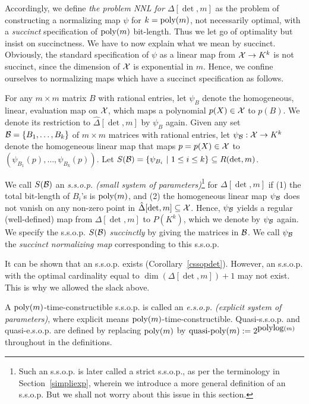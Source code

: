 \documentclass[11pt]{article}
\begin{document}
Accordingly, we define {\em the problem NNL for $\Delta[\det,m]$}
as  the problem of constructing  a normalizing map $\psi$ for $k={\mbox {poly}}(m)$, not necessarily optimal,
with a {\em succinct} specification of ${\mbox {poly}}(m)$ bit-length. Thus we let go of optimality but insist on succinctness.
We have to now explain what we mean by  succinct.
Obviously,  the standard specification of $\psi$ as a linear map from
${\cal X} \to K^k$ is not succinct, since the dimension of ${\cal X}$ is exponential in $m$. 
Hence, we  confine ourselves to normalizing maps which have a succinct specification as follows.


For any $m \times m$  matrix $B$ with rational entries, let
$\psi_{B}$ denote the homogeneous, linear, evaluation map on  ${\cal X}$, which maps a polynomial
$p(X) \in {\cal X}$ to $p(B)$. We denote its restriction to $\hat \Delta[\det,m]$ by $\psi_B$ again.
Given any set ${\cal B}=\{B_1,\ldots,B_k\}$ of $m\times m$  matrices with 
rational entries, 
let $\psi_{{\cal B}}: {\cal X}  \rightarrow K^k$ denote the homogeneous linear map that maps 
$p=p(X) \in {\cal X}$ to $(\psi_{B_1}(p),\ldots,\psi_{B_k}(p))$. 
Let $S({\cal B})=\{\psi_{B_i} \ | \ 1 \le i \le k \} \subseteq R(\det,m)$.

We call $S({\cal B})$ an {\em  s.s.o.p. (small system of parameters)}\footnote{Such an s.s.o.p. is later called a strict s.s.o.p.,
as per the 
terminology in Section~\ref{simpliexp}, wherein we introduce a more general definition of an s.s.o.p. But we shall not worry about this  issue in this section.}
for $\Delta[\det,m]$ if  (1) the total bit-length of   $B_i$'s
is ${\mbox {poly}}(m)$, and (2) the homogeneous linear map
$\psi_{{\cal B}}$ does not vanish on any non-zero point in $\hat \Delta[\det,m] \subseteq {\cal X}$. Hence, 
$\psi_{{\cal B}}$  yields  a regular (well-defined) map  from  $\Delta[\det,m]$ to $P(K^k)$, which we denote by
$\psi_{{\cal B}}$ again. We specify the s.s.o.p. $S({\cal B})$ {\em succinctly}
by  giving the matrices in ${\cal B}$.
We call  $\psi_{{\cal B}}$ the  {\em succinct normalizing map} corresponding to this s.s.o.p.


It can be shown that an s.s.o.p.
exists (Corollary~\ref{cssopdet}). However, an
s.s.o.p. with the optimal cardinality equal to
$\dim(\Delta[\det,m])+1$ may  not exist. This is why we allowed the slack above. 

A ${\mbox {poly}}(m)$-time-constructible s.s.o.p. is  called 
an {\em e.s.o.p. (explicit system of parameters)}, where  explicit means ${\mbox {poly}}(m)$-time-constructible.
Quasi-s.s.o.p. and quasi-e.s.o.p. are 
defined  by replacing ${\mbox {poly}}(m)$ by  $\mbox{quasi-poly}(m):= 2^{{\mbox {polylog}}(m)}$ 
throughout in the definitions.
\end{document}
